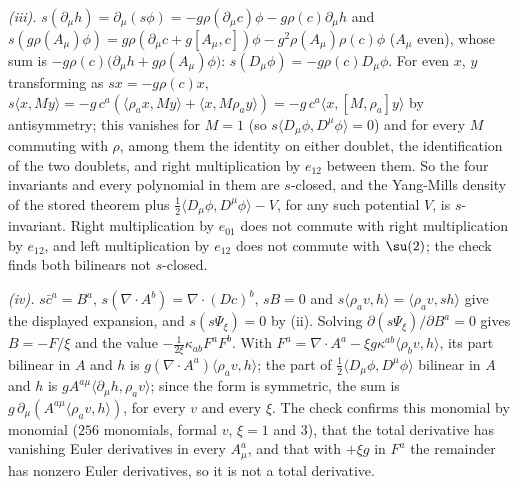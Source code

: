 \emph{(iii).} $s(\partial_\mu h) = \partial_\mu(s\phi) = -g\rho(\partial_\mu c)\phi - g\rho(c)\partial_\mu h$ and $s(g\rho(A_\mu)\phi) = g\rho(\partial_\mu c + g[A_\mu, c])\phi - g^{2}\rho(A_\mu)\rho(c)\phi$ ($A_\mu$ even), whose sum is $-g\rho(c)\big(\partial_\mu h + g\rho(A_\mu)\phi\big)$: $s(D_\mu\phi) = -g\rho(c)D_\mu\phi$. For even $x$, $y$ transforming as $sx = -g\rho(c)x$, $s\langle x, My\rangle = -g\,c^{a}(\langle\rho_{a}x, My\rangle + \langle x, M\rho_{a}y\rangle) = -g\,c^{a}\langle x, [M, \rho_{a}]y\rangle$ by antisymmetry; this vanishes for $M = 1$ (so $s\langle D_\mu\phi, D^{\mu}\phi\rangle = 0$) and for every $M$ commuting with $\rho$, among them the identity on either doublet, the identification of the two doublets, and right multiplication by $e_{12}$ between them. So the four invariants and every polynomial in them are $s$-closed, and the Yang-Mills density of the stored theorem plus $\tfrac12\langle D_\mu\phi, D^{\mu}\phi\rangle - V$, for any such potential $V$, is $s$-invariant. Right multiplication by $e_{01}$ does not commute with right multiplication by $e_{12}$, and left multiplication by $e_{12}$ does not commute with $\su(2)$; the check finds both bilinears not $s$-closed.

\emph{(iv).} $s\bar c^{a} = B^{a}$, $s(\nabla\cdot A^{b}) = \nabla\cdot(Dc)^{b}$, $sB = 0$ and $s\langle\rho_{a}v, h\rangle = \langle\rho_{a}v, sh\rangle$ give the displayed expansion, and $s(s\Psi_{\xi}) = 0$ by (ii). Solving $\partial(s\Psi_{\xi})/\partial B^{a} = 0$ gives $B = -F/\xi$ and the value $-\tfrac{1}{2\xi}\kappa_{ab}F^{a}F^{b}$. With $F^{a} = \nabla\cdot A^{a} - \xi g\kappa^{ab}\langle\rho_{b}v, h\rangle$, its part bilinear in $A$ and $h$ is $g(\nabla\cdot A^{a})\langle\rho_{a}v, h\rangle$; the part of $\tfrac12\langle D_\mu\phi, D^{\mu}\phi\rangle$ bilinear in $A$ and $h$ is $g A^{a\mu}\langle\partial_\mu h, \rho_{a}v\rangle$; since the form is symmetric, the sum is $g\,\partial_\mu(A^{a\mu}\langle\rho_{a}v, h\rangle)$, for every $v$ and every $\xi$. The check confirms this monomial by monomial ($256$ monomials, formal $v$, $\xi = 1$ and $3$), that the total derivative has vanishing Euler derivatives in every $A^{a}_{\mu}$, and that with $+\xi g$ in $F^{a}$ the remainder has nonzero Euler derivatives, so it is not a total derivative.

